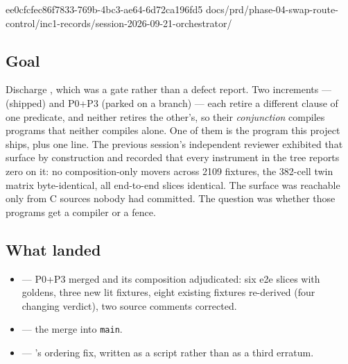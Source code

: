 %
  {ee0cfcfe}{c86f7833-769b-4bc3-ae64-6d72ca196fd5}%
  {docs/prd/phase-04-swap-route-control/inc1-records/session-2026-09-21-orchestrator/}

\subsection*{Goal}
Discharge , which was a gate rather than a defect report. Two increments --- 
(shipped) and  P0+P3 (parked on a branch) --- each retire a different clause of one
predicate, and neither retires the other's, so their \emph{conjunction} compiles programs that
neither compiles alone. One of them is the program this project ships, plus one line. The previous
session's independent reviewer exhibited that surface by construction and recorded that every
instrument in the tree reports zero on it: no composition-only movers across 2109 fixtures, the
382-cell twin matrix byte-identical, all end-to-end slices identical. The surface was reachable only
from C sources nobody had committed. The question was whether those programs get a compiler or a
fence.

\subsection*{What landed}
\begin{itemize}
  \item {} ---  P0+P3 merged and its composition adjudicated: six e2e slices
        with goldens, three new lit fixtures, eight existing fixtures re-derived (four changing
        verdict), two source comments corrected.
  \item {} --- the merge into \texttt{main}.
  \item {} --- 's ordering fix, written as a script
        rather than as a third erratum.
\end{itemize}

